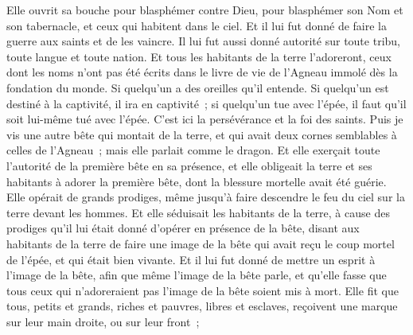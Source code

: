 \begin{multicols}{2}
Elle ouvrit sa bouche pour blasphémer contre Dieu, pour blasphémer son Nom et son tabernacle, et ceux qui habitent dans le ciel.
Et il lui fut donné de faire la guerre aux saints et de les vaincre. Il lui fut aussi donné autorité sur toute tribu, toute langue et toute nation.
Et tous les habitants de la terre l'adoreront, ceux dont les noms n'ont pas été écrits dans le livre de vie de l'Agneau immolé dès la fondation du monde.
Si quelqu'un a des oreilles qu'il entende.
Si quelqu'un est destiné à la captivité, il ira en captivité~; si quelqu'un tue avec l'épée, il faut qu'il soit lui-même tué avec l'épée. C'est ici la persévérance et la foi des saints.
Puis je vis une autre bête qui montait de la terre, et qui avait deux cornes semblables à celles de l'Agneau~; mais elle parlait comme le dragon.
Et elle exerçait toute l'autorité de la première bête en sa présence, et elle obligeait la terre et ses habitants à adorer la première bête, dont la blessure mortelle avait été guérie.
Elle opérait de grands prodiges, même jusqu'à faire descendre le feu du ciel sur la terre devant les hommes.
Et elle séduisait les habitants de la terre, à cause des prodiges qu'il lui était donné d'opérer en présence de la bête, disant aux habitants de la terre de faire une image de la bête qui avait reçu le coup mortel de l'épée, et qui était bien vivante.
Et il lui fut donné de mettre un esprit à l'image de la bête, afin que même l'image de la bête parle, et qu'elle fasse que tous ceux qui n'adoreraient pas l'image de la bête soient mis à mort.
Elle fit que tous, petits et grands, riches et pauvres, libres et esclaves, reçoivent une marque sur leur main droite, ou sur leur front~;

\end{multicols}
